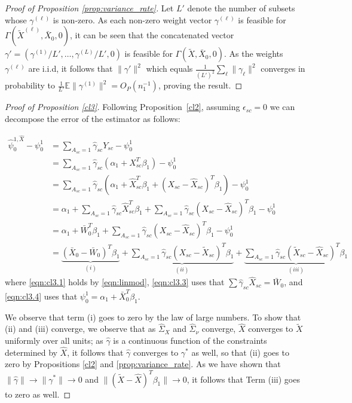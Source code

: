 \begin{proof}[Proof of Proposition \ref{prop:variance_rate}]
Let $L'$ denote the number of subsets whose $\gamma^{(\ell)}$ is non-zero. As each non-zero weight vector $\gamma^{(\ell)}$ is feasible for $\Gamma(\tilde{X}^{(\ell)}, \bar{X}_0, 0)$, it can be seen that the concatenated vector $\gamma' = (\gamma^{(1)}/L', \ldots, \gamma^{(L)}/L', 0)$ is feasible for $\Gamma(\tilde{X},\bar{X}_0,0)$. As the weights $\gamma^{(\ell)}$ are i.i.d, it follows that $\| \gamma'\|^2$ which equals $\frac{1}{(L')^2} \sum_\ell \|\gamma_\ell\|^2$  converges in probability to $\frac{1}{L'} \mathbb{E}\|\gamma^{(1)}\|^2 = O_P(n_1^{-1})$, proving the result.
\end{proof}


\begin{proof}[Proof of Proposition \ref{cl3}]
Following Proposition~\ref{cl2}, assuming $\epsilon_{sc}=0$ we can decompose the error of the estimator as follows:

\begin{align}
\nonumber    \hat{\psi}^{1,\hat{X}}_0 - \psi_0^1 &= \sum_{A_{sc}=1} \hat{\gamma}_{sc} Y_{sc} - \psi_0^1 \\
    & = \sum_{A_{sc}=1} \hat{\gamma}_{sc} (\alpha_1 + X_{sc}^T \beta_1) - \psi_0^1 \label{eqn:cl3.1}\\
    \nonumber & = \sum_{A_{sc}=1} \hat{\gamma}_{sc} (\alpha_1 + \hat{X}_{sc}^T \beta_1 + (X_{sc} - \hat{X}_{sc})^T \beta_1 ) - \psi_0^1 \label{eqn:cl3.2}\\
    \nonumber & = \alpha_1 + \sum_{A_{sc}=1} \hat{\gamma}_{sc} \hat{X}_{sc}^T \beta_1 + \sum_{A_{sc}=1} \hat{\gamma}_{sc}(X_{sc} - \hat{X}_{sc})^T \beta_1  - \psi_0^1 \label{eqn:cl3.3}\\
    & = \alpha_1 + \bar{W}_0^T \beta_1 + \sum_{A_{sc}=1} \hat{\gamma}_{sc}(X_{sc} - \hat{X}_{sc})^T \beta_1  - \psi_0^1 \label{eqn:cl3.3}\\
    & = \underbrace{(\bar{X}_0 - \bar{W}_0)^T \beta_1}_{(i)} + \underbrace{\sum_{A_{sc}=1} \hat{\gamma}_{sc}(X_{sc} - \tilde{X}_{sc})^T \beta_1}_{(ii)} + \underbrace{\sum_{A_{sc}=1} \hat{\gamma}_{sc} (\tilde{X}_{sc} - \hat{X}_{sc})^T \beta_1}_{(iii)} \label{eqn:cl3.4}
\end{align}
where \eqref{eqn:cl3.1} holds by \eqref{eqn:linmod}, \eqref{eqn:cl3.3} uses that $\sum \hat{\gamma}_{sc} \hat{X}_{sc} = \bar{W}_0$, and \eqref{eqn:cl3.4} uses that $\psi_{0}^1 = \alpha_1 + \bar{X}_0^T \beta_1$.

We observe that term (i) goes to zero by the law of large numbers. To show that (ii) and (iii) converge, we observe that as  $\hat{\Sigma}_X$ and $\hat{\Sigma}_\nu$ converge, $\hat{X}$ converges to $\tilde{X}$ uniformly over all units; as $\hat{\gamma}$ is a continuous function of the constraints determined by $\hat{X}$, it follows that $\hat{\gamma}$ converges to $\gamma^*$ as well, so that (ii) goes to zero by Propositions \ref{cl2} and \ref{prop:variance_rate}. As we have shown that $\|\hat{\gamma}\| \to \|\gamma^*\| \to 0$ and $\|(\tilde{X} - \hat{X})^T \beta_1\|\to 0$, it follows that Term (iii) goes to zero as well.



\end{proof}
